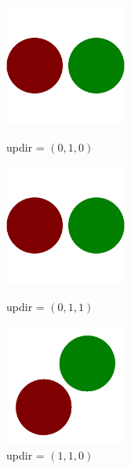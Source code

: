 \documentclass{assignment}
\begin{document}
\begin{enumerate}
       \begin{figure}[H]
        \centering
        \begin{minipage}[c]{0.3\linewidth}
         \centering
         \includegraphics[width=4cm]{img/e1a.png}
         \caption{updir = \((0,1,0)\)}
        \end{minipage}
        \begin{minipage}[c]{0.3\linewidth}
         \centering
         \includegraphics[width=4cm]{img/e1b.png}
         \caption{updir = \((0,1,1)\)}
        \end{minipage}
        \begin{minipage}[c]{0.3\linewidth}
         \centering
         \includegraphics[width=4cm]{img/e1c.png}
         \caption{updir = \((1,1,0)\)}
        \end{minipage}
       \end{figure}


\end{enumerate}
\end{document}
